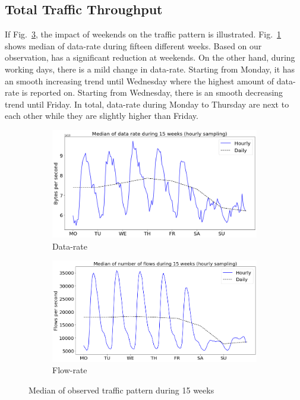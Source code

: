 \documentclass[10pt, journal, letterpaper]{IEEEtran}
\newcommand\figSzeMahdi{0.8}
\begin{document}
\subsection{Total Traffic Throughput}
If Fig.~\ref{fig:OW_bps_fps}, the impact of weekends on the traffic pattern is illustrated. Fig.~\ref{fig:OW_bps} shows median of data-rate during fifteen different weeks. Based on our observation, has a significant reduction at weekends. On the other hand, during working days, there is a mild change in data-rate. Starting from Monday, it has an smooth increasing trend until Wednesday where the highest amount of data-rate is reported on. Starting from Wednesday, there is an smooth decreasing trend until Friday. In total, data-rate during Monday to Thursday are next to each other while they are slightly higher than Friday.
\begin{figure}[!htb]
\centering
    \begin{subfigure}{\figSzeMahdi\columnwidth}
          \centering
          \includegraphics[width=\columnwidth]{img/OW_byterate.png}
          \caption{Data-rate}
          \label{fig:OW_bps}
    \end{subfigure}
    \begin{subfigure}{\figSzeMahdi\columnwidth}
          \centering
          \includegraphics[width=\columnwidth]{img/OW_flowrate.png}
          \caption{Flow-rate}
          \label{fig:OW_fps}
    \end{subfigure}
    \caption{Median of observed traffic pattern during 15 weeks}
    \label{fig:OW_bps_fps}
\end{figure}
\end{document}
